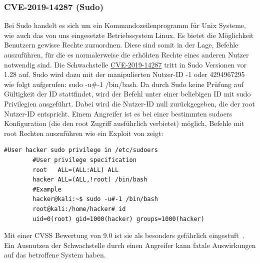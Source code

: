 \documentclass[10pt, a4paper,onecolumn ,titlepage]{article}
\begin{document}
    \subsubsection{CVE-2019-14287 (Sudo)}
    \label{subsubsec:sudo}
    Bei Sudo handelt es sich um ein Kommandozeilenprogramm für Unix Systeme, wie auch das von uns eingesetzte Betriebssystem Linux.
    Es bietet die Möglichkeit Benutzern gewisse Rechte zuzuordnen.
    Diese sind somit in der Lage, Befehle auszuführen, für die es normalerweise die erhöhten Rechte eines anderen Nutzer notwendig sind.
    Die Schwachstelle \href{https://www.cvedetails.com/cve/CVE-2019-14287/?q=CVE-2019-14287}{CVE-2019-14287} tritt in Sudo Versionen vor 1.28 auf.
    Sudo wird dazu mit der manipulierten Nutzer-ID -1 oder 4294967295 wie folgt aufgerufen: sudo -u\#-1 /bin/bash.
    Da durch Sudo keine Prüfung auf Gültigkeit der ID stattfindet, wird der Befehl unter einer beliebigen ID mit sudo Privilegien ausgeführt.
    Dabei wird die Nutzer-ID null zurückgegeben, die der root Nutzer-ID entspricht.
    Einem Angreifer ist es bei einer bestimmten sudoers Konfiguration (die den root Zugriff ausführlich verbietet) möglich, Befehle mit root Rechten auszuführen wie ein Exploit von \textcite{privilegeEscalationSudoExploit} zeigt:
    \vspace{0.5cm}
    \begin{lstlisting}[label={lst:examplesudo}]
        #User hacker sudo privilege in /etc/sudoers
        #User privilege specification
        root   ALL=(ALL:ALL) ALL
        hacker ALL=(ALL,!root) /bin/bash
        #Example
        hacker@kali:~$ sudo -u#-1 /bin/bash
        root@kali:/home/hacker# id
        uid=0(root) gid=1000(hacker) groups=1000(hacker)
    \end{lstlisting}
    \vspace{0.5}
    Mit einer CVSS Bewertung von 9.0 ist sie als besonders gefährlich eingestuft~\parencite{privilegeEscalationSudo}.
    Ein Ausnutzen der Schwachstelle durch einen Angreifer kann fatale Auswirkungen auf das betroffene System haben.
\end{document}
